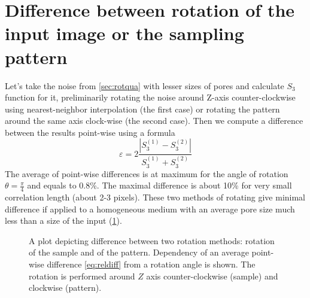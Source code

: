 \documentclass[reprint,amsmath,amssymb,aps,pre,showkeys,showpacs]{revtex4-1}
\begin{document}
\section{Difference between rotation of the input image or the sampling pattern}
\label{sec:rotrot}
Let's take the noise from \cref{sec:rotqua} with lesser sizes of pores and
calculate $S_3$ function for it, preliminarily rotating the noise around Z-axis
counter-clockwise using nearest-neighbor interpolation (the first case) or
rotating the pattern around the same axis clock-wise (the second case). Then we
compute a difference between the results point-wise using a formula
\begin{equation}
  \varepsilon = 2\frac{|S_3^{(1)} - S_3^{(2)}|}{S_3^{(1)} + S_3^{(2)}}
  \label{eq:reldiff}
\end{equation}
The average of point-wise differences is at maximum for the angle of rotation
$\theta = \frac{\pi}{4}$ and equals to 0.8\%. The maximal difference is about
10\% for very small correlation length (about 2-3 pixels). These two methods of
rotating give minimal difference if applied to a homogeneous medium with an
average pore size much less than a size of the input (\cref{fig:rotdiff}).
\begin{figure}[tp]
  \centering
  \hfill
  \caption[]{A plot depicting difference between two rotation methods: rotation
    of the sample and of the pattern. Dependency of an average point-wise
    difference \cref{eq:reldiff} from a rotation angle is shown. The rotation is
    performed around $Z$ axis counter-clockwise (sample) and clockwise (pattern).}
  \label{fig:rotdiff}
\end{figure}


\end{document}
